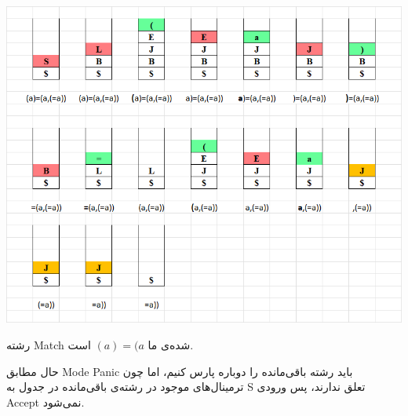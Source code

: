 \includegraphics[width=1\linewidth]{figs/2.png}

رشته Match شده‌ی ما
$(a)=(a$
است.

حال مطابق Mode Panic باید رشته باقی‌مانده را دوباره پارس کنیم، اما چون ترمینال‌های موجود در رشته‌ی باقی‌مانده در جدول به S تعلق ندارند، پس ورودی Accept نمی‌شود.









